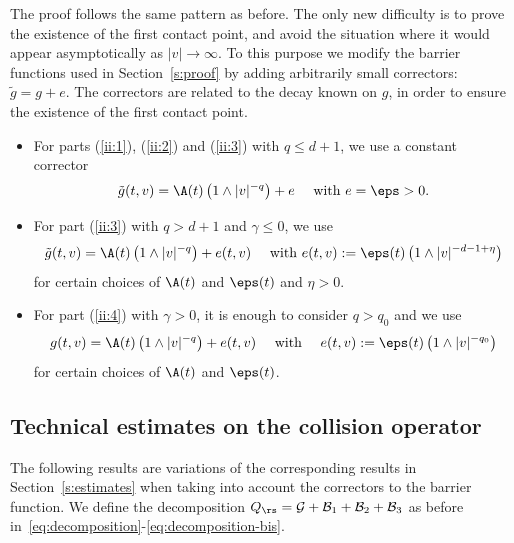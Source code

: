 The proof follows the same pattern as before. The only new difficulty
is to prove the existence of the first contact point, and avoid the
situation where it would appear asymptotically as $|v| \to \infty$. To
this purpose we modify the barrier functions used in
Section~\ref{s:proof} by adding arbitrarily small correctors:
$\tilde g = g + e$. The correctors are related to the decay known on
$g$, in order to ensure the existence of the first contact point.

\begin{itemize}
\item For parts (\ref{ii:1}), (\ref{ii:2}) and (\ref{ii:3}) with
$q \leq d+1$, we use a constant corrector
\begin{equation}
\label{e:g1}
\tilde g(t,v) = \A(t) \left(1 \wedge |v|^{-q}\right) + e \quad
\mbox{ with } e = \eps >0.
\end{equation}

\item For part (\ref{ii:3}) with $q>d+1$ and $\gamma \leq 0$, we use
\begin{equation} \label{e:g2} \tilde g(t,v) = \A(t) \left(1 \wedge
|v|^{-q} \right) + e(t,v) \quad \mbox{ with } e(t,v):=\eps(t) \left(1 \wedge
|v|^{-d-1+\eta}\right)
\end{equation}
for certain choices of $\A(t)$ and $\eps(t)$ and $\eta>0$.

\item For part (\ref{ii:4}) with $\gamma > 0$, it is enough to
consider $q > q_0$ and we use
\begin{equation} \label{e:g3} g(t,v) = \A(t) \left(1 \wedge |v|^{-q}\right) +
e(t,v) \quad \mbox{ with } \quad e(t,v) := \eps(t) \left(1 \wedge
|v|^{-q_0}\right)
\end{equation}
for certain choices of $\A(t)$ and $\eps(t)$.
\end{itemize}

\subsection{Technical estimates on the collision operator}

The following results are variations of the corresponding results in
Section~\ref{s:estimates} when taking into account the correctors to
the barrier function. We define the decomposition
$Q_{\rs} = \mathcal{G} + \mathcal{B}_1 + \mathcal{B}_2 + \mathcal{B}_3$ as
before in~\eqref{eq:decomposition}-\eqref{eq:decomposition-bis}.

